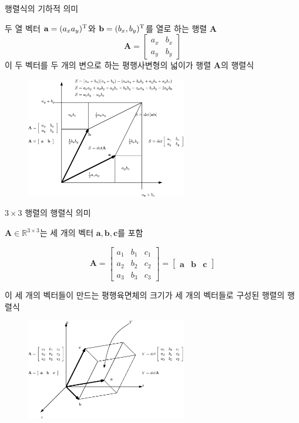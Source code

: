 \begin{frame}{행렬식의 기하적 의미}

두 열 벡터 $\mathbf a = (a_x a_y )^{\rm T}$와 $\mathbf b = (b_x , b_y)^{\rm T}$를 열로 하는 행렬 $\mathbf A$
$$\mathbf A = \left [ 
\begin{array}{cc}
a_x & b_x \\
a_y & b_y
\end{array}
\right ]
$$
이 두 벡터를 두 개의 변으로 하는 평행사변형의 넓이가 행렬 $\mathbf A$의 행렬식



\begin{figure}
\includegraphics[width=7cm]{Math_matrix/determinantGeo.eps}
\end{figure}

\end{frame}


\begin{frame}{$3 \times 3$ 행렬의 행렬식 의미}

$\mathbf A \in \mathbb R^{3 \times 3}$는 세 개의 벡터 $\mathbf a, \mathbf b, \mathbf c$를 포함

$$
\mathbf A = \left [ \begin{array}{ccc}
a_1 & b_1 & c_1 \\
a_2 & b_2 & c_2 \\
a_3 & b_3 & c_3 
\end{array} \right ] =
\left [ \begin{array}{ccc}
\mathbf a & \mathbf b & \mathbf c
\end{array} \right ] 
$$

이 세 개의 벡터들이 만드는 평행육면체의 크기가 세 개의 벡터들로 구성된 행렬의 행렬식


\begin{figure}
\includegraphics[width=7cm]{Math_matrix/determinantGeo3D.eps}
\end{figure}

\end{frame}



